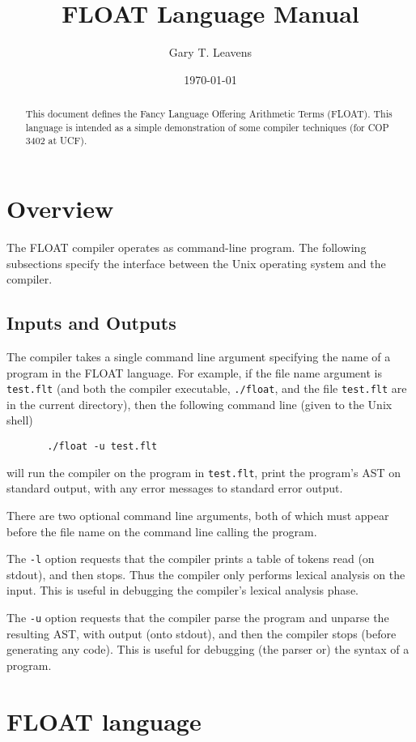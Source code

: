 \documentclass[11pt]{article}
\title{FLOAT Language Manual}
\author{Gary T. Leavens}
\date{\today}
\begin{document}
\noindent
\maketitle
%
\begin{abstract}
This document defines the Fancy Language Offering Arithmetic Terms
(FLOAT).
This language is intended as a simple demonstration of some compiler
techniques (for COP 3402 at UCF).
\end{abstract}

\section{Overview}

The FLOAT compiler operates as command-line program.
The following subsections specify the interface between the Unix
operating system and the compiler.

\subsection{Inputs and Outputs}

The compiler takes a single command line argument specifying the name
of a program in the FLOAT language.
For example, if the file name argument is \texttt{test.flt}
(and both the compiler executable, \texttt{./float},
and the file \texttt{test.flt} are in the current directory),
then the following command line (given to the Unix shell)
\begin{lstlisting}
       ./float -u test.flt
\end{lstlisting}
will run the compiler on the program in \texttt{test.flt},
print the program's AST on standard output,
with any error messages to standard error output.

There are two optional command line arguments, both of which must
appear before the file name on the command line calling the program.

The \texttt{-l} option requests that the compiler
prints a table of tokens read (on stdout), and then stops.
Thus the compiler only performs lexical analysis on the input.
This is useful in debugging the compiler's lexical analysis phase.

The \texttt{-u} option requests that the compiler parse the program
and unparse the resulting AST, with output (onto stdout), and then the
compiler stops (before generating any code).
This is useful for debugging (the parser or) the syntax of a program.

\section{FLOAT language}
\end{document}

